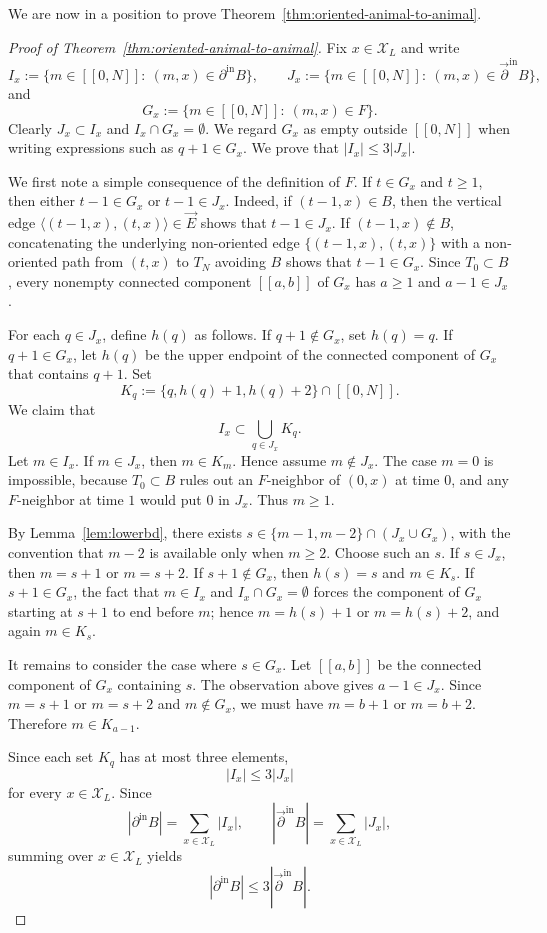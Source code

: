 \documentclass[11pt]{amsart}
\theoremstyle{definition}
\numberwithin{equation}{section}
\newcommand{\mrm}[1]{\mathrm{#1}}
\newcommand{\1}{\mathbbm{1}}
\newcommand{\arrow}[1]{\overrightarrow{#1}}
\newcommand{\arpartial}{\arrow{\partial}}
\newcommand{\Chi}{\mathcal{X}}
\begin{document}
We are now in a position to prove Theorem~\ref{thm:oriented-animal-to-animal}.
\begin{proof}[Proof of Theorem~\ref{thm:oriented-animal-to-animal}]
Fix $x\in \Chi_L$ and write
\[
I_x:=\{m\in[\![0,N]\!]:\ (m,x)\in \partial^{\mrm{in}} B\},\qquad
J_x:=\{m\in[\![0,N]\!]:\ (m,x)\in \arpartial^{\mrm{in}} B\},
\]
and
\[
G_x:=\{m\in[\![0,N]\!]:\ (m,x)\in F\}.
\]
Clearly $J_x\subset I_x$ and $I_x\cap G_x=\emptyset$.
We regard $G_x$ as empty outside $[\![0,N]\!]$ when writing expressions such as $q+1\in G_x$.
We prove that $|I_x|\le 3|J_x|$.

We first note a simple consequence of the definition of $F$. If $t\in G_x$ and
$t\ge 1$, then either $t-1\in G_x$ or $t-1\in J_x$. Indeed, if
$(t-1,x)\in B$, then the vertical edge
$\langle(t-1,x),(t,x)\rangle\in \arrow{E}$ shows that $t-1\in J_x$. If
$(t-1,x)\notin B$, concatenating the underlying non-oriented edge
$\{(t-1,x),(t,x)\}$ with a non-oriented path
from $(t,x)$ to $T_N$ avoiding $B$ shows that
$t-1\in G_x$. Since $T_0\subset B$, every nonempty connected component
$[\![a,b]\!]$ of $G_x$ has $a\ge 1$ and $a-1\in J_x$.

For each $q\in J_x$, define $h(q)$ as follows. If $q+1\notin G_x$, set
$h(q)=q$. If $q+1\in G_x$, let $h(q)$ be the upper endpoint of the connected
component of $G_x$ that contains $q+1$. Set
\[
K_q:=\{q,h(q)+1,h(q)+2\}\cap[\![0,N]\!].
\]
We claim that
\[
I_x\subset \bigcup_{q\in J_x} K_q.
\]
Let $m\in I_x$. If $m\in J_x$, then $m\in K_m$. Hence assume $m\notin J_x$.
The case $m=0$ is impossible, because $T_0\subset B$ rules out an $F$-neighbor
of $(0,x)$ at time $0$, and any $F$-neighbor at time $1$ would put $0$ in
$J_x$. Thus $m\ge 1$.

By Lemma~\ref{lem:lowerbd}, there exists
$s\in\{m-1,m-2\}\cap(J_x\cup G_x)$, with the convention that $m-2$ is available only when $m\ge2$.
Choose such an $s$. If $s\in J_x$, then $m=s+1$ or $m=s+2$. If $s+1\notin G_x$, then
$h(s)=s$ and $m\in K_s$. If $s+1\in G_x$, the fact that $m\in I_x$ and
$I_x\cap G_x=\emptyset$ forces the component of $G_x$ starting at $s+1$ to end
before $m$; hence $m=h(s)+1$ or $m=h(s)+2$, and again $m\in K_s$.

It remains to consider the case where $s\in G_x$. Let
$[\![a,b]\!]$ be the connected component of $G_x$ containing $s$. The observation
above gives $a-1\in J_x$. Since $m=s+1$ or $m=s+2$ and $m\notin G_x$, we must
have $m=b+1$ or $m=b+2$. Therefore $m\in K_{a-1}$.

 Since each set $K_q$ has at most three elements,
\[
|I_x|\le 3|J_x|
\]
for every $x\in\Chi_L$. Since
\[
|\partial^{\mrm{in}}B|=\sum_{x\in\Chi_L}|I_x|,
\qquad
|\arpartial^{\mrm{in}}B|=\sum_{x\in\Chi_L}|J_x|,
\]
summing over $x\in\Chi_L$ yields
\[
|\partial^{\mrm{in}} B|\le 3|\arpartial^{\mrm{in}} B|.
\]
\end{proof}
\end{document}
